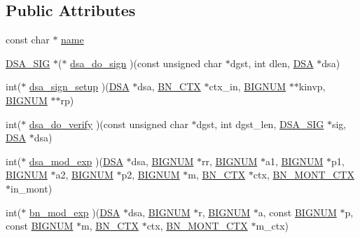 \subsection*{Public Attributes}
\begin{DoxyCompactItemize}
\item 
const char $\ast$ \hyperlink{structdsa__method_a83d504a9d8609d6172a7e4a824791933}{name}
\item 
\hyperlink{dsa_8h_a48a9879e7bbc21af161fb409c679f3c8}{D\+S\+A\+\_\+\+S\+IG} $\ast$($\ast$ \hyperlink{structdsa__method_acac9dacfe7fd6637af11f0280ed087ad}{dsa\+\_\+do\+\_\+sign} )(const unsigned char $\ast$dgst, int dlen, \hyperlink{ossl__typ_8h_aa26536f205a5c5f39111260bf246ed9d}{D\+SA} $\ast$dsa)
\item 
int($\ast$ \hyperlink{structdsa__method_a6c731fb594e9d87b38351caf21b52f72}{dsa\+\_\+sign\+\_\+setup} )(\hyperlink{ossl__typ_8h_aa26536f205a5c5f39111260bf246ed9d}{D\+SA} $\ast$dsa, \hyperlink{ossl__typ_8h_a0b235a35b7dd7922c097571ecd90e2bc}{B\+N\+\_\+\+C\+TX} $\ast$ctx\+\_\+in, \hyperlink{ossl__typ_8h_a6fb19728907ec6515e4bfb716bffa141}{B\+I\+G\+N\+UM} $\ast$$\ast$kinvp, \hyperlink{ossl__typ_8h_a6fb19728907ec6515e4bfb716bffa141}{B\+I\+G\+N\+UM} $\ast$$\ast$rp)
\item 
int($\ast$ \hyperlink{structdsa__method_a48d8dcf12cd14676633cde4b06dbe1c5}{dsa\+\_\+do\+\_\+verify} )(const unsigned char $\ast$dgst, int dgst\+\_\+len, \hyperlink{dsa_8h_a48a9879e7bbc21af161fb409c679f3c8}{D\+S\+A\+\_\+\+S\+IG} $\ast$sig, \hyperlink{ossl__typ_8h_aa26536f205a5c5f39111260bf246ed9d}{D\+SA} $\ast$dsa)
\item 
int($\ast$ \hyperlink{structdsa__method_a6295bfda1f4be2fc9e04e69c6a104f4d}{dsa\+\_\+mod\+\_\+exp} )(\hyperlink{ossl__typ_8h_aa26536f205a5c5f39111260bf246ed9d}{D\+SA} $\ast$dsa, \hyperlink{ossl__typ_8h_a6fb19728907ec6515e4bfb716bffa141}{B\+I\+G\+N\+UM} $\ast$rr, \hyperlink{ossl__typ_8h_a6fb19728907ec6515e4bfb716bffa141}{B\+I\+G\+N\+UM} $\ast$a1, \hyperlink{ossl__typ_8h_a6fb19728907ec6515e4bfb716bffa141}{B\+I\+G\+N\+UM} $\ast$p1, \hyperlink{ossl__typ_8h_a6fb19728907ec6515e4bfb716bffa141}{B\+I\+G\+N\+UM} $\ast$a2, \hyperlink{ossl__typ_8h_a6fb19728907ec6515e4bfb716bffa141}{B\+I\+G\+N\+UM} $\ast$p2, \hyperlink{ossl__typ_8h_a6fb19728907ec6515e4bfb716bffa141}{B\+I\+G\+N\+UM} $\ast$m, \hyperlink{ossl__typ_8h_a0b235a35b7dd7922c097571ecd90e2bc}{B\+N\+\_\+\+C\+TX} $\ast$ctx, \hyperlink{ossl__typ_8h_aec902d353e00ced6d3fee6cd033a8bd0}{B\+N\+\_\+\+M\+O\+N\+T\+\_\+\+C\+TX} $\ast$in\+\_\+mont)
\item 
int($\ast$ \hyperlink{structdsa__method_afeec883c6d822b9faa7a03f2217fc651}{bn\+\_\+mod\+\_\+exp} )(\hyperlink{ossl__typ_8h_aa26536f205a5c5f39111260bf246ed9d}{D\+SA} $\ast$dsa, \hyperlink{ossl__typ_8h_a6fb19728907ec6515e4bfb716bffa141}{B\+I\+G\+N\+UM} $\ast$r, \hyperlink{ossl__typ_8h_a6fb19728907ec6515e4bfb716bffa141}{B\+I\+G\+N\+UM} $\ast$a, const \hyperlink{ossl__typ_8h_a6fb19728907ec6515e4bfb716bffa141}{B\+I\+G\+N\+UM} $\ast$p, const \hyperlink{ossl__typ_8h_a6fb19728907ec6515e4bfb716bffa141}{B\+I\+G\+N\+UM} $\ast$m, \hyperlink{ossl__typ_8h_a0b235a35b7dd7922c097571ecd90e2bc}{B\+N\+\_\+\+C\+TX} $\ast$ctx, \hyperlink{ossl__typ_8h_aec902d353e00ced6d3fee6cd033a8bd0}{B\+N\+\_\+\+M\+O\+N\+T\+\_\+\+C\+TX} $\ast$m\+\_\+ctx)

\end{DoxyCompactItemize}
